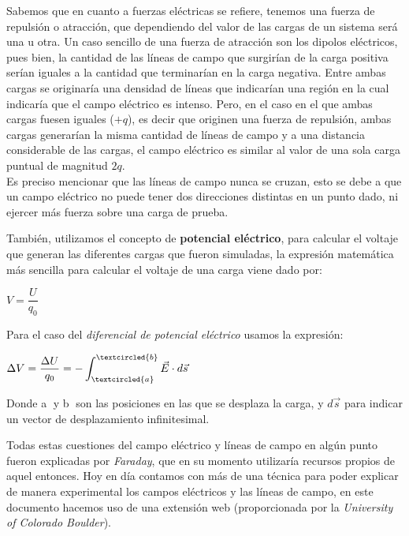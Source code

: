 \documentclass[a4paper,10pt]{article}
\begin{document}
\begin{multicols}{2}
Sabemos que en cuanto a fuerzas eléctricas se refiere, tenemos una fuerza de repulsión o atracción, que dependiendo del valor de las cargas de un sistema será una u otra. Un caso sencillo de una fuerza de atracción son los dipolos eléctricos, pues bien, la cantidad de las líneas de campo que surgirían de la carga positiva serían iguales a la cantidad que terminarían en la carga negativa. Entre ambas cargas se originaría una densidad de líneas que indicarían una región en la cual indicaría que el campo eléctrico es intenso.
Pero, en el caso en el que ambas cargas fuesen iguales ($+q$), es decir que originen una fuerza de repulsión, ambas cargas generarían la misma cantidad de líneas de campo y a una distancia considerable de las cargas, el campo eléctrico es similar al valor de una sola carga puntual de magnitud $2q$. \\
Es preciso mencionar que las líneas de campo nunca se cruzan, esto se debe a que un campo eléctrico no puede tener dos direcciones distintas en un punto dado, ni ejercer más fuerza sobre una carga de prueba. \cite{8} \par
También, utilizamos el concepto de \textbf{potencial eléctrico}, para calcular el voltaje que generan las diferentes cargas que fueron simuladas, la expresión matemática más sencilla para calcular el voltaje de una carga viene dado por: \par
\vspace{2mm}
\centerline{$V=\dfrac{U}{q_0}$}\par
\vspace{2mm}
Para el caso del \textit{diferencial de potencial eléctrico} usamos la expresión:\par
\vspace{2mm}
\centerline{$\Delta V=\dfrac{\Delta U}{q_0}=- \displaystyle\int_{\tiny \textcircled{a}}^{\tiny \textcircled{b}}\Vec{E}\cdot d\Vec{s}$} \par
\vspace{2mm}
Donde {\small \textcircled{a}} y {\small \textcircled{b}} son las posiciones en las que se desplaza la carga, y $d\Vec{s}$ para indicar un vector de desplazamiento infinitesimal. \cite{1} \par
Todas estas cuestiones del campo eléctrico y líneas de campo en algún punto fueron explicadas por \textit{Faraday}, que en su momento utilizaría recursos propios de aquel entonces. Hoy en día contamos con más de una técnica para poder explicar de manera experimental los campos eléctricos y las líneas de campo, en este documento hacemos uso de una extensión web\cite{5} (proporcionada por la \textit{University of Colorado Boulder}). \par


\end{multicols}
\end{document}
